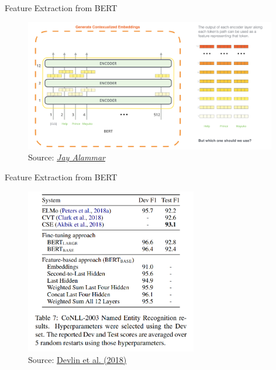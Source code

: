 
\begin{vbframe}{Feature Extraction from BERT}

\vfill

	\begin{figure}
		\centering
		\includegraphics[width = 11cm]{figure/bert-featextr.png}\\ 
		\footnotesize{Source:} \href{https://jalammar.github.io/illustrated-bert/}{\footnotesize \it Jay Alammar}
	\end{figure}

\vfill

\end{vbframe}


\begin{frame}{Feature Extraction from BERT}

	\begin{figure}
	\centering
		\includegraphics[width = 7.5cm]{figure/bert-featextr-results.png}\\ 
		\footnotesize{Source:} \href{https://arxiv.org/pdf/1810.04805.pdf}{\footnotesize Devlin et al. (2018)}
	\end{figure}

\end{frame}


\endlecture

